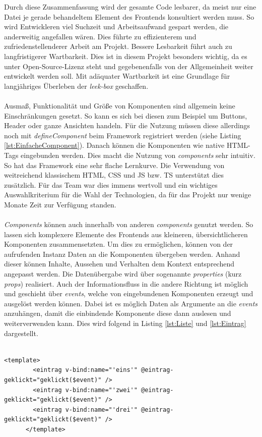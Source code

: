 \documentclass[10pt, a4paper]{article}
\begin{document}
\begin{onehalfspace}
  Durch diese Zusammenfassung wird der gesamte Code lesbarer,
  da meist nur eine Datei je gerade behandeltem Element des Frontends konsultiert werden muss.
  So wird Entwickleren viel Suchzeit und Arbeitsaufwand gespart werden, die anderweitig angefallen wären.
  Dies führte zu effizienterem und zufriedenstellenderer Arbeit am Projekt.
  Bessere Lesbarkeit führt auch zu langfristigerer Wartbarkeit.
  Dies ist in diesem Projekt besonders wichtig,
  da es unter Open-Source-Lizenz steht und gegebenenfalls von der Allgemeinheit weiter entwickelt werden soll.
  Mit adäquater Wartbarkeit ist eine Grundlage für langjähriges Überleben der \textit{leek-box} geschaffen.
  \\~\\
  Ausmaß, Funktionalität und Größe von Komponenten sind allgemein keine Einschränkungen gesetzt.
  So kann es sich bei diesen zum Beispiel um Buttons, Header oder ganze Ansichten handeln.
  Für die Nutzung müssen diese allerdings noch mit \textit{defineComponent} beim Framework registriert werden
  (siehe Listing \ref{lst:EinfacheComponent}).
  Danach können die Komponenten wie native HTML-Tags eingebunden werden.
  Dies macht die Nutzung von \textit{components} sehr intuitiv.
  So hat das Framework eine sehr flache Lernkurve.
  Die Verwendung von weitreichend klassischem HTML, CSS und JS bzw. TS unterstützt dies zusätzlich.
  Für das Team war dies immens wertvoll und ein wichtiges Auswahlkriterium für die Wahl der Technologien,
  da für das Projekt nur wenige Monate Zeit zur Verfügung standen.
  \\~\\
  \textit{Components} können auch innerhalb von anderen \textit{components} genutzt werden.
  So lassen sich komplexere Elemente des Frontends aus kleineren, übersichtlicheren Komponenten zusammensetzten.
  Um dies zu ermöglichen, können von der aufrufenden Instanz Daten an die Komponenten übergeben werden.
  Anhand dieser können Inhalte, Aussehen und Verhalten dem Kontext entsprechend angepasst werden.
  Die Datenübergabe wird über sogenannte \textit{properties} (kurz \textit{props}) realisiert.
  Auch der Informationsfluss in die andere Richtung ist möglich und geschieht über \textit{events}, welche von eingebundenen Komponenten erzeugt und ausgelöst werden können.
  Dabei ist es möglich Daten als Argumente an die \textit{events} anzuhängen, damit die einbindende Komponente diese dann auslesen und weiterverwenden kann.
  Dies wird folgend in Listing \ref{lst:Liste} und \ref{lst:Eintrag} dargestellt.
  \\~\\
  \begin{minipage}{\textwidth}
    \begin{lstlisting}[caption={beispielhafte Listen-Komponente (Liste.vue)}, captionpos=b, label=lst:Liste]
      <template>
        <eintrag v-bind:name="'eins'" @eintrag-geklickt="geklickt($event)" />
        <eintrag v-bind:name="'zwei'" @eintrag-geklickt="geklickt($event)" />
        <eintrag v-bind:name="'drei'" @eintrag-geklickt="geklickt($event)" />
      </template>


\end{lstlisting}
\end{minipage}
\end{onehalfspace}
\end{document}
